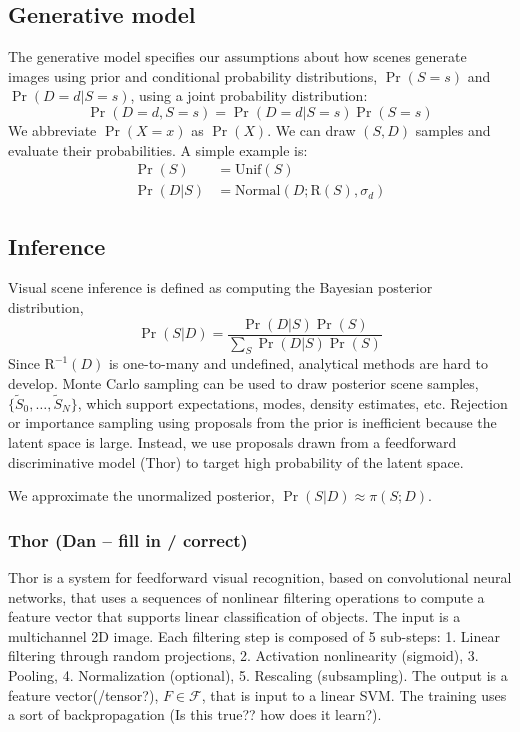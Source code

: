 \documentclass[]{report}
\begin{document}
\subsection*{Generative model}
The generative model specifies our assumptions about how scenes
generate images using prior and conditional probability distributions,
$\Pr(S=s)$ and $\Pr(D=d | S=s)$, using a joint probability distribution: 
\[
\Pr(D=d,S=s) = \Pr(D=d | S=s)\Pr(S=s)
\]
We abbreviate $\Pr(X=x)$ as $\Pr(X)$.  We can draw $(S,D)$ samples and
evaluate their probabilities. A simple example is:
\begin{align*}
  \Pr(S) &= \mathrm{Unif}(S)\\
  \Pr(D | S) &= \mathrm{Normal}(D; \mathrm{R}(S), \sigma_d)
\end{align*}

\subsection*{Inference}
Visual scene inference is defined as computing the Bayesian posterior
distribution,
\[
\Pr(S | D) = \frac{\Pr(D | S)\Pr(S)}{\sum_S \Pr(D | S)\Pr(S)}
\]
Since $\mathrm{R}^{-1}(D)$ is one-to-many and undefined, analytical
methods are hard to develop.  Monte Carlo sampling can be used to draw
posterior scene samples, $\{\tilde{S}_0,\dots,\tilde{S}_N\}$, which
support expectations, modes, density estimates, etc. Rejection or
importance sampling using proposals from the prior is inefficient
because the latent space is large. Instead, we use proposals drawn
from a feedforward discriminative model (Thor) to target high
probability of the latent space.

We approximate the unormalized posterior, $\Pr(S | D) \approx \pi(S;
D)$.

\subsubsection*{Thor (Dan -- fill in / correct)}
Thor is a system for feedforward visual recognition, based on
convolutional neural networks, that uses a sequences of nonlinear
filtering operations to compute a feature vector that supports linear
classification of objects. The input is a multichannel 2D image. Each
filtering step is composed of 5 sub-steps: 1. Linear filtering through
random projections, 2. Activation nonlinearity (sigmoid), 3. Pooling,
4. Normalization (optional), 5. Rescaling (subsampling). The output is
a feature vector(/tensor?), $F \in \mathcal{F}$, that is input to a
linear SVM. The training uses a sort of backpropagation (Is this
true?? how does it learn?).
\end{document}
